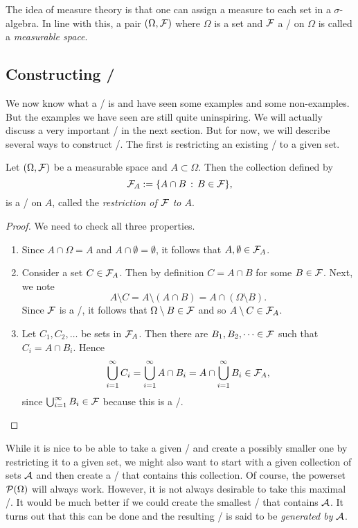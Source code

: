 \medskip

The idea of measure theory is that one can assign a measure to each set in a $\sigma$-algebra. In line with this, a pair $(\Omega, \mathcal F)$ where $\Omega$ is a set and $\mathcal F$ a \sigalg/ on $\Omega$ is called a \emph{measurable space}. 

\subsection{Constructing \sigalgs/}\label{ssec:construction_sigalgs}

We now know what a \sigalg/ is and have seen some examples and some non-examples. But the examples we have seen are still quite uninspiring. We will actually discuss a very important \sigalg/ in the next section. But for now, we will describe several ways to construct \sigalgs/. The first is restricting an existing \sigalg/ to a given set.

\begin{lemma}\label{lem:restriction_sigma_algebra}
Let $(\Omega, \mathcal F)$ be a measurable space and $A \subset \Omega$. Then the collection defined by 
\[
	\mathcal F_A := \{A \cap B \, : \, B \in \mathcal F\},
\]
is a \sigalg/ on $A$, called the \emph{restriction of $\mathcal F$ to $A$}.
\end{lemma}

\begin{proof}
We need to check all three properties.
\begin{enumerate}
\item Since $A \cap \Omega = A$ and $A \cap \emptyset = \emptyset$, it follows that $A, \emptyset \in \mathcal F_A$.
\item Consider a set $C \in \mathcal F_A$. Then by definition $C = A \cap B$ for some $B \in \mathcal F$. Next, we note
\[
	A \setminus C = A \setminus (A \cap B) = A \cap (\Omega \setminus B).
\]
Since $\mathcal F$ is a \sigalg/, it follows that $\Omega \setminus B \in \mathcal F$ and so $A \setminus C \in \mathcal F_A$.
\item Let $C_1, C_2, \dots$ be sets in $\mathcal F_A$. Then there are $B_1, B_2, \dots \in \mathcal F$ such that $C_i = A \cap B_i$. Hence
\[
	\bigcup_{i=1}^\infty C_i = \bigcup_{i=1}^\infty A \cap B_i = A \cap \bigcup_{i=1}^\infty B_i \in \mathcal F_A,
\]
since $\bigcup_{i=1}^\infty B_i \in \mathcal F$ because this is a \sigalg/. \qedhere
\end{enumerate}
\end{proof}

While it is nice to be able to take a given \sigalg/ and create a possibly smaller one by restricting it to a given set, we might also want to start with a given collection of sets $\mathcal A$ and then create a \sigalg/ that contains this collection. Of course, the powerset $\mathcal P(\Omega)$ will always work. However, it is not always desirable to take this maximal \sigalg/. It would be much better if we could create the smallest \sigalg/ that contains $\mathcal A$. It turns out that this can be done and the resulting \sigalg/ is said to be \emph{generated by $\mathcal A$}. 

